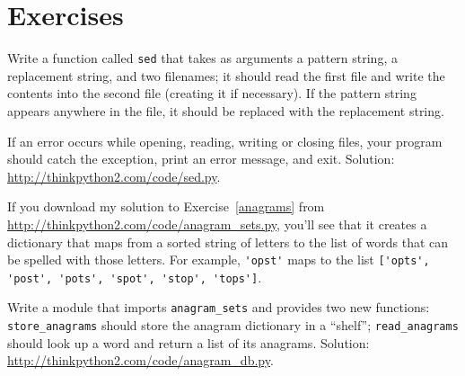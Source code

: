 \documentclass[10pt]{book}
\begin{document}
\section{Exercises}

\begin{exercise}

Write a function called {\tt sed} that takes as arguments a pattern string,
a replacement string, and two filenames; it should read the first file
and write the contents into the second file (creating it if
necessary).  If the pattern string appears anywhere in the file, it
should be replaced with the replacement string.

If an error occurs while opening, reading, writing or closing files,
your program should catch the exception, print an error message, and
exit.  Solution: \url{http://thinkpython2.com/code/sed.py}.

\end{exercise}


\begin{exercise}

If you download my solution to Exercise~\ref{anagrams} from
\url{http://thinkpython2.com/code/anagram_sets.py}, you'll see that it creates
a dictionary that maps from a sorted string of letters to the list of
words that can be spelled with those letters.  For example,
\verb"'opst'" maps to the list
\verb"['opts', 'post', 'pots', 'spot', 'stop', 'tops']".

Write a module that imports \verb"anagram_sets" and provides
two new functions: \verb"store_anagrams" should store the
anagram dictionary in a ``shelf''; \verb"read_anagrams" should
look up a word and return a list of its anagrams.
Solution: \url{http://thinkpython2.com/code/anagram_db.py}.

\end{exercise}
\end{document}
